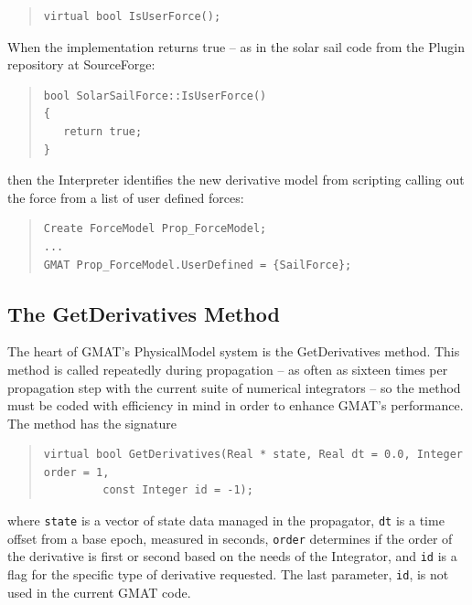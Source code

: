 \documentclass[letterpaper,10pt]{article}
\begin{document}
\begin{quote}
\begin{verbatim}
virtual bool IsUserForce();
\end{verbatim}
\end{quote}

\noindent When the implementation returns true -- as in the solar sail code from
the Plugin repository at SourceForge:

\begin{quote}
\begin{verbatim}
bool SolarSailForce::IsUserForce()
{
   return true;
}
\end{verbatim}
\end{quote}

\noindent then the Interpreter identifies the new derivative model from
scripting calling out the force from a list of user defined forces:

\begin{quote}
\begin{verbatim}
Create ForceModel Prop_ForceModel;
...
GMAT Prop_ForceModel.UserDefined = {SailForce};
\end{verbatim}
\end{quote}

\subsection{The GetDerivatives Method}

The heart of GMAT's PhysicalModel system is the GetDerivatives method.  This
method is called repeatedly during propagation -- as often as sixteen times per
propagation step with the current suite of numerical integrators -- so the
method must be coded with efficiency in mind in order to enhance GMAT's
performance.  The method has the signature

\begin{quote}
\begin{verbatim}
virtual bool GetDerivatives(Real * state, Real dt = 0.0, Integer order = 1, 
         const Integer id = -1);
\end{verbatim}
\end{quote}

\noindent where \texttt{state} is a vector of state data managed in the
propagator, \texttt{dt} is a time offset from a base epoch, measured in
seconds, \texttt{order} determines if the order of the derivative is first or
second based on the needs of the Integrator, and \texttt{id} is a flag for the
specific type of derivative requested.  The last parameter, \texttt{id}, is not
used in the current GMAT code. 
\end{document}
